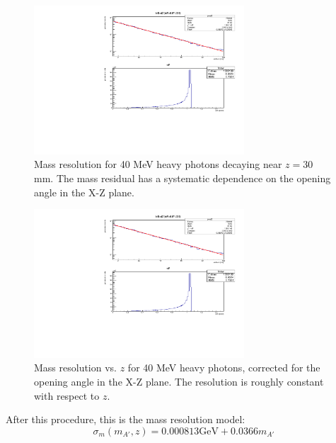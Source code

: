\begin{figure}[ht]
\begin{center}
    \includegraphics[width=0.7\textwidth,page=5,angle=-90]{vertexing/figs/acceptance_40}
\end{center}
    \caption{Mass resolution for 40 MeV heavy photons decaying near $z=30$ mm. The mass residual has a systematic dependence on the opening angle in the X-Z plane.}
    \label{fig:mass_skew}
\end{figure}

\begin{figure}[ht]
\begin{center}
    \includegraphics[width=0.7\textwidth,page=6,angle=-90]{vertexing/figs/acceptance_40}
\end{center}
    \caption{Mass resolution vs. $z$ for 40 MeV heavy photons, corrected for the opening angle in the X-Z plane. The resolution is roughly constant with respect to $z$.}
    \label{fig:fixed_mres}
\end{figure}

After this procedure, this is the mass resolution model:
\begin{equation}
\sigma_m(m_{A'},z) = 0.000813 \mathrm{GeV} + 0.0366 m_{A'}
\end{equation}


